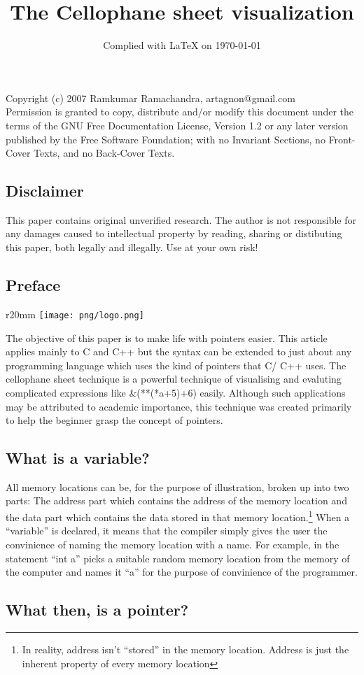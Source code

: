 \documentclass[10pt,twoside]{article}
\begin{document}
\title{The Cellophane sheet visualization}
\date{Complied with \LaTeX{} on \today}
\maketitle
\begin{center}
{\scriptsize Copyright (c) 2007 Ramkumar Ramachandra,
artagnon@gmail.com\\ Permission is granted to copy, distribute and/or
modify this document under the terms of the GNU Free Documentation
License, Version 1.2 or any later version published by the Free
Software Foundation; with no Invariant Sections, no Front-Cover Texts,
and no Back-Cover Texts.}
\end{center}

\subsection*{Disclaimer}
This paper contains original unverified research. The author is not responsible
for any damages caused to intellectual property by reading, sharing or
distibuting this paper, both legally and illegally. Use at your own risk!

\subsection*{Preface}

\begin{wrapfigure}{r}{20mm}
\texttt{[image: png/logo.png]}
\end{wrapfigure}

The objective of this paper is to make life with pointers easier. This article
applies mainly to C and C++ but the syntax can be extended to just about any
programming language which uses the kind of pointers that C/ C++ uses. The
cellophane sheet technique is a powerful technique of visualising and evaluting
complicated expressions like \&(**(*a+5)+6) easily. Although such applications
may be attributed to academic importance, this technique was created primarily
to help the beginner grasp the concept of pointers.


\subsection*{What is a variable?}
All memory locations can be, for the purpose of illustration, broken up into two
parts: The address part which contains the address of the memory location and
the data part which contains the data stored in that memory
location.\footnote{In reality, address isn't ``stored'' in the memory location.
Address is just the inherent property of every memory location} When a
``variable'' is declared, it means that the compiler simply gives the user the
convinience of naming the memory location with a name. For example, in the
statement ``int a'' picks a suitable random memory location from the memory of
the computer and names it ``a'' for the purpose of convinience of the
programmer.  \newpage \subsection*{What then, is a pointer?}
\end{document}
